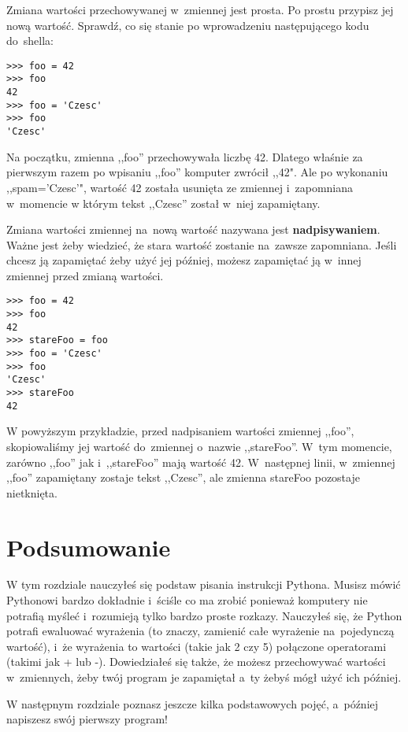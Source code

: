 \documentclass{book}
\begin{document}
Zmiana wartości przechowywanej w~zmiennej jest prosta. Po prostu przypisz jej nową wartość. Sprawdź, co się stanie po wprowadzeniu następującego kodu do~shella:

\begin{lstlisting}
>>> foo = 42
>>> foo
42
>>> foo = 'Czesc'
>>> foo
'Czesc'
\end{lstlisting}

Na początku, zmienna ,,foo'' przechowywała liczbę 42. Dlatego właśnie za pierwszym razem po wpisaniu ,,foo'' komputer zwrócił ,,42". Ale po wykonaniu ,,spam='Czesc'", wartość 42 została usunięta ze zmiennej i~zapomniana w~momencie w którym tekst ,,Czesc'' został w~niej zapamiętany.

Zmiana wartości zmiennej na~nową wartość nazywana jest {\bf nadpisywaniem}. Ważne jest żeby wiedzieć, że stara wartość zostanie na~zawsze zapomniana. Jeśli chcesz ją zapamiętać żeby użyć jej później, możesz zapamiętać ją w~innej zmiennej przed zmianą wartości.

\begin{lstlisting}
>>> foo = 42
>>> foo
42
>>> stareFoo = foo
>>> foo = 'Czesc'
>>> foo
'Czesc'
>>> stareFoo
42
\end{lstlisting}

W powyższym przykładzie, przed nadpisaniem wartości zmiennej ,,foo'', skopiowaliśmy jej wartość do~zmiennej o~nazwie ,,stareFoo''. W~tym momencie, zarówno ,,foo'' jak i~,,stareFoo'' mają wartość 42. W~następnej linii, w~zmiennej ,,foo'' zapamiętany zostaje tekst ,,Czesc'', ale zmienna stareFoo pozostaje nietknięta.

\section{Podsumowanie}

W tym rozdziale nauczyłeś się podstaw pisania instrukcji Pythona. Musisz mówić Pythonowi bardzo dokładnie i~ściśle co ma zrobić ponieważ komputery nie potrafią myśleć i~rozumieją tylko bardzo proste rozkazy. Nauczyłeś się, że Python potrafi ewaluować wyrażenia (to znaczy, zamienić całe wyrażenie na~pojedynczą wartość), i~że wyrażenia to wartości (takie jak 2 czy 5) połączone operatorami (takimi jak + lub -). Dowiedziałeś się także, że możesz przechowywać wartości w~zmiennych, żeby twój program je zapamiętał a~ty żebyś mógł użyć ich później.

W następnym rozdziale poznasz jeszcze kilka podstawowych pojęć, a~później napiszesz swój pierwszy program!
\end{document}
